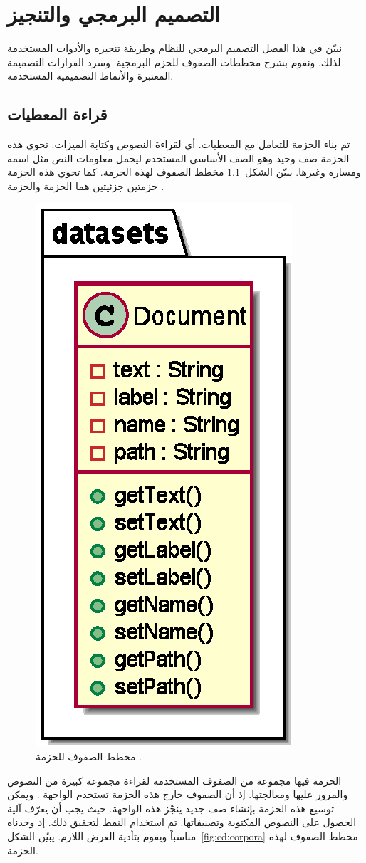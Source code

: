 

\chapter{التصميم البرمجي والتنجيز}
نبيّن في هذا الفصل التصميم البرمجي للنظام وطريقة تنجيزه والأدوات المستخدمة لذلك.
ونقوم بشرح مخططات الصفوف للحزم البرمجية.
وسرد القرارات التصميمة المعتبرة والأنماط التصميمية  المستخدمة.





\section{قراءة المعطيات}
تم بناء الحزمة  للتعامل مع المعطيات. أي لقراءة النصوص وكتابة الميزات.
تحوي هذه الحزمة صف وحيد  وهو الصف الأساسي المستخدم ليحمل معلومات النص مثل اسمه ومساره وغيرها.
يبيّن الشكل~\ref{fig:cd:datasets} مخطط الصفوف لهذه الحزمة.
كما تحوي هذه الحزمة حزمتين جزئيتين هما الحزمة  والحزمة .

\begin{figure}[htb]
	\centering
	\includegraphics[width=0.25\linewidth]{images/cd-datasets.eps}
	\caption{%
		مخطط الصفوف للحزمة .
	}
	\label{fig:cd:datasets}
\end{figure}

الحزمة  فيها مجموعة من الصفوف المستخدمة لقراءة مجموعة كبيرة من النصوص والمرور عليها ومعالجتها.
إذ أن الصفوف خارج هذه الحزمة تستخدم الواجهة .
ويمكن توسيع هذه الحزمة بإنشاء صف جديد ينجّز هذه الواجهة.
حيث يجب أن يعرّف آلية الحصول على النصوص المكتوبة وتصنيفاتها.
تم استخدام النمط  لتحقيق ذلك.
إذ وجدناه مناسباً ويقوم بتأدية الغرض اللازم.
يبيّن الشكل~\ref{fig:cd:corpora} مخطط الصفوف لهذه الخزمة.

